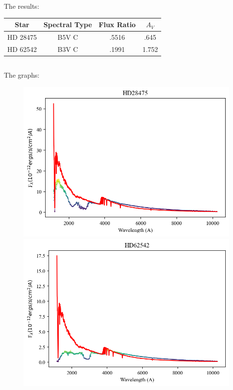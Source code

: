 \documentclass{article}
\begin{document}
    The results:

    \begin{center}
        \begin{tabular}{|c | c | c | c|}
        \hline
        Star & Spectral Type & Flux Ratio & $A_V$ \\
        \hline
        HD 28475 & B5V C & .5516 & .645 \\
        HD 62542 & B3V C & .1991 & 1.752 \\
        \hline
        \end{tabular}
    \end{center}

    \subsection{}
    The graphs:

    \begin{figure}[H]
        \centering
        \includegraphics[scale = .5]{first.png}
        \includegraphics[scale = .5]{second.png}
    \end{figure}
\end{document}
